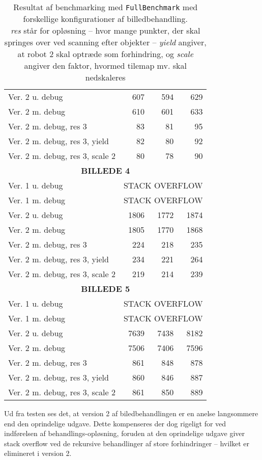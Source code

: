 \begin{table}[!hp]
\begin{center}
\begin{tabular}{l | r r r}
		Ver. 2 u. debug & 607 & 594 & 629 \\
		Ver. 2 m. debug & 610 & 601 & 633 \\
		Ver. 2 m. debug, res 3 & 83 & 81 & 95 \\
		Ver. 2 m. debug, res 3, yield & 82 & 80 & 92 \\
		Ver. 2 m. debug, res 3, scale 2 & 80 & 78 & 90 \\
		\hline
		\multicolumn{4}{c}{\textbf{BILLEDE 4}}\\
		\hline
		Ver. 1 u. debug & \multicolumn{3}{c}{STACK OVERFLOW} \\
		Ver. 1 m. debug & \multicolumn{3}{c}{STACK OVERFLOW} \\
		Ver. 2 u. debug & 1806 & 1772 & 1874 \\
		Ver. 2 m. debug & 1805 & 1770 & 1868 \\
		Ver. 2 m. debug, res 3 & 224 & 218 & 235 \\
		Ver. 2 m. debug, res 3, yield & 234 & 221 & 264 \\
		Ver. 2 m. debug, res 3, scale 2 & 219 & 214 & 239 \\
		\hline
		\multicolumn{4}{c}{\textbf{BILLEDE 5}}\\
		\hline
		Ver. 1 u. debug & \multicolumn{3}{c}{STACK OVERFLOW} \\
		Ver. 1 m. debug & \multicolumn{3}{c}{STACK OVERFLOW} \\
		Ver. 2 u. debug & 7639 & 7438 & 8182 \\
		Ver. 2 m. debug & 7506 & 7406 & 7596 \\
		Ver. 2 m. debug, res 3 & 861 & 848 & 878 \\
		Ver. 2 m. debug, res 3, yield & 860 & 846 & 887 \\
		Ver. 2 m. debug, res 3, scale 2 & 861 & 850 & 889 \\
	\end{tabular}
	\caption{Resultat af benchmarking med \texttt{FullBenchmark} med forskellige konfigurationer af billedbehandling.\\
	\scriptsize{\textit{res} står for opløsning -- hvor mange punkter, der skal springes over ved scanning efter objekter -- \textit{yield} angiver, at robot 2 skal optræde som forhindring, og \textit{scale} angiver den faktor, hvormed tilemap mv. skal nedskaleres}}\label{tab:ip-test-performance}
	\end{center}
\end{table}

Ud fra testen ses det, at version 2 af biledbehandlingen er en anelse langsommere end den oprindelige udgave. Dette kompenseres der dog rigeligt for ved indførelsen af behandlings-opløsning, foruden at den oprindelige udgave giver stack overflow ved de rekursive behandlinger af store forhindringer -- hvilket er elimineret i version 2.

